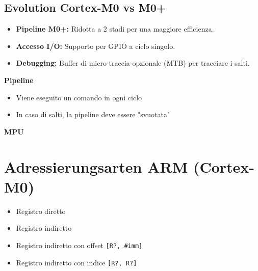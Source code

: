 \subsection{Evolution Cortex-M0 vs M0+}
\begin{minipage}[t]{0.49\columnwidth}
    \begin{itemize}
        \item \textbf{Pipeline M0+:} Ridotta a 2 stadi per una maggiore efficienza.
        \item \textbf{Accesso I/O:} Supporto per GPIO a ciclo singolo.
        \item \textbf{Debugging:} Buffer di micro-traccia opzionale (MTB) per tracciare i salti.
    \end{itemize}
\end{minipage}\hfill
\begin{minipage}[t]{0.49\columnwidth}
    \textbf{Pipeline}
    \begin{itemize}
        \item[+] Viene eseguito un comando in ogni ciclo
        \item [-] In caso di salti, la pipeline deve essere "svuotata"
    \end{itemize}
    \textbf{MPU}
\end{minipage}


\section{Adressierungsarten ARM (Cortex-M0)}
\begin{minipage}{0.5\columnwidth}
    \begin{itemize}
        \item Registro diretto
        \item Registro indiretto
    \end{itemize}
\end{minipage}
\begin{minipage}{0.5\columnwidth}
    \begin{itemize}
        \item Registro indiretto con offset \texttt{[R?, \#imm]}
        \item Registro indiretto con indice \texttt{[R?, R?]}
    \end{itemize}
\end{minipage}

